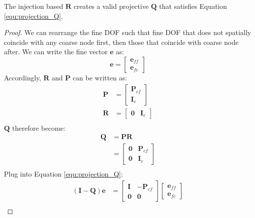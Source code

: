 \begin{lem}\label{lemma:injection}The injection based $\mathbf{R}$ creates a valid projective $\mathbf{Q}$ that satisfies Equation \ref{equ:projection_Q}.\end{lem}
\begin{proof}
We can rearrange the fine DOF such that fine DOF that does not spatially coincide with any coarse node first, then those that coincide with coarse node after. We can write the fine vector $\mathbf{e}$ as:
\begin{equation*}
\mathbf{e} = \left[ \begin{aligned}
    \mathbf{e}_{ff}\\
    \mathbf{e}_{fc}
  \end{aligned}\right]
\end{equation*}
Accordingly, $\mathbf{R}$ and $\mathbf{P}$ can be written as:
\begin{align*}
\mathbf{P} &= \left[ \begin{array}{c}
    \mathbf{P}_{cf}\\
    \mathbf{I}_{c}
  \end{array}\right]\\
  \mathbf{R} &= \left[ \begin{array}{cc}
    \mathbf{0} & \mathbf{I}_{c}
  \end{array}\right]\\
 \end{align*}
 $\mathbf{Q}$ therefore become:
 \begin{align*}
  \mathbf{Q} &= \mathbf{P}\mathbf{R} \\
  &= \left[ \begin{array}{cc}
    \mathbf{0} & \mathbf{P}_{cf} \\
    \mathbf{0} & \mathbf{I}_c
  \end{array}\right]\\
 \end{align*}
 Plug into Equation \ref{equ:projection_Q}:
 \begin{align*}
(\mathbf{I} - \mathbf{Q})\mathbf{e} &= \left[ \begin{array}{cc}
    \mathbf{I} & -\mathbf{P}_{cf} \\
    \mathbf{0} & \mathbf{0}
  \end{array}\right] \left[ \begin{array}{c}
    \mathbf{e}_{ff}\\
    \mathbf{e}_{fc}
  \end{array}\right]\\

\end{align*}
\end{proof}
